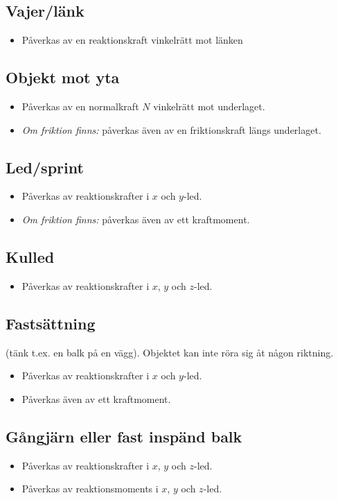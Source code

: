 \documentclass{article}
\newenvironment{ankiflashcard}[1][ ]{}{}
\begin{document}
\begin{paracol}{2}
\begin{ankiflashcard}
\subsection{Vajer/länk}
\begin{itemize}
    \item Påverkas av en reaktionskraft vinkelrätt mot länken
\end{itemize}
\end{ankiflashcard}

\subsection{Objekt mot yta}
\begin{itemize}
    \item Påverkas av en normalkraft $N$ vinkelrätt mot underlaget.
    \item \textit{Om friktion finns:} påverkas även av en friktionskraft längs underlaget.
\end{itemize}
\subsection{Led/sprint}
\begin{itemize}
    \item Påverkas av reaktionskrafter i $x$ och $y$-led.
    \item \textit{Om friktion finns:} påverkas även av ett kraftmoment.
\end{itemize}
\subsection{Kulled}
\begin{itemize}
    \item Påverkas av reaktionskrafter i $x$, $y$ och $z$-led.
\end{itemize}
\subsection{Fastsättning}
(tänk t.ex. en balk på en vägg). Objektet kan inte röra sig åt någon riktning.
\begin{itemize}
    \item Påverkas av reaktionskrafter i $x$ och $y$-led.
    \item Påverkas även av ett kraftmoment.
\end{itemize}
\subsection{Gångjärn eller fast inspänd balk}
\begin{itemize}
    \item Påverkas av reaktionskrafter i $x$, $y$ och $z$-led.
    \item Påverkas av reaktionsmoments i $x$, $y$ och $z$-led.
\end{itemize}
\end{paracol}
\end{document}
